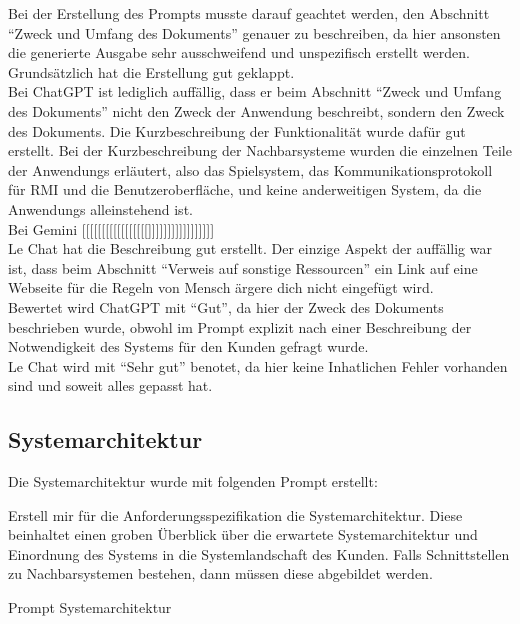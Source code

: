 Bei der Erstellung des Prompts musste darauf geachtet werden, den Abschnitt ``Zweck und Umfang des Dokuments'' genauer zu beschreiben, da hier ansonsten
die generierte Ausgabe sehr ausschweifend und unspezifisch erstellt werden. Grundsätzlich hat die Erstellung gut geklappt.\\
Bei ChatGPT ist lediglich auffällig, dass er beim Abschnitt ``Zweck und Umfang des Dokuments'' nicht den Zweck der Anwendung beschreibt, sondern den Zweck 
des Dokuments. Die Kurzbeschreibung der Funktionalität wurde dafür gut erstellt. Bei der Kurzbeschreibung der Nachbarsysteme wurden die einzelnen Teile 
der Anwendungs erläutert, also das Spielsystem, das Kommunikationsprotokoll für RMI und die Benutzeroberfläche, und keine anderweitigen System, da die 
Anwendungs alleinstehend ist.\\
Bei Gemini [[[[[[[[[[[[[[[[[]]]]]]]]]]]]]]]]]\\
Le Chat hat die Beschreibung gut erstellt. Der einzige Aspekt der auffällig war ist, dass beim Abschnitt ``Verweis auf sonstige Ressourcen'' ein Link 
auf eine Webseite für die Regeln von Mensch ärgere dich nicht eingefügt wird.\\

Bewertet wird ChatGPT mit ``Gut'', da hier der Zweck des Dokuments beschrieben wurde, obwohl im Prompt explizit nach einer Beschreibung der Notwendigkeit
des Systems für den Kunden gefragt wurde.\\
Le Chat wird mit ``Sehr gut'' benotet, da hier keine Inhatlichen Fehler vorhanden sind und soweit alles gepasst hat. 

\subsection*{Systemarchitektur}

Die Systemarchitektur wurde mit folgenden Prompt erstellt:

\begin{prompt}[H]
    \begin{tcolorbox}[colback=gray!20, colframe=gray!20, boxrule=0pt, sharp corners] 
        Erstell mir für die Anforderungsspezifikation die Systemarchitektur. Diese beinhaltet einen groben Überblick über die erwartete Systemarchitektur 
        und Einordnung des Systems in die Systemlandschaft des Kunden. Falls Schnittstellen zu Nachbarsystemen bestehen, dann müssen diese abgebildet werden.
        \vfill
    \end{tcolorbox}
    \caption{Prompt Systemarchitektur}
    \label{Prompt Systemarchitektur}
\end{prompt}

